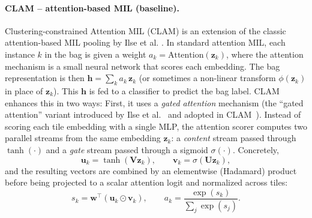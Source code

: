 \paragraph{CLAM – attention-based MIL (baseline).} Clustering-constrained Attention MIL (CLAM) \cite{Lu} is an extension of the classic attention-based MIL pooling by Ilse et al. \cite{ilse2018}. In standard attention MIL, each instance $k$ in the bag is given a weight $a_k = \text{Attention}(\mathbf{z}_k)$, where the attention mechanism is a small neural network that scores each embedding. The bag representation is then $\mathbf{h} = \sum_k a_k\,\mathbf{z}_k$ (or sometimes a non-linear transform $\phi(\mathbf{z}_k)$ in place of $\mathbf{z}_k$). This $\mathbf{h}$ is fed to a classifier to predict the bag label. CLAM enhances this in two ways: First, it uses a \emph{gated attention} mechanism (the ``gated attention'' variant introduced by Ilse et al.~\cite{ilse2018} and adopted in CLAM~\cite{Lu}). Instead of scoring each tile embedding with a single MLP, the attention scorer computes two parallel streams from the same embedding $\mathbf{z}_k$: a \emph{content} stream passed through $\tanh(\cdot)$ and a \emph{gate} stream passed through a sigmoid $\sigma(\cdot)$. Concretely,
\begin{equation}
\mathbf{u}_k=\tanh(\mathbf{V}\mathbf{z}_k),\qquad
\mathbf{v}_k=\sigma(\mathbf{U}\mathbf{z}_k),
\end{equation}
and the resulting vectors are combined by an elementwise (Hadamard) product before being projected to a scalar attention logit and normalized across tiles:
\begin{equation}
s_k=\mathbf{w}^\top(\mathbf{u}_k\odot\mathbf{v}_k),\qquad
a_k=\frac{\exp(s_k)}{\sum_j \exp(s_j)}.
\end{equation}
